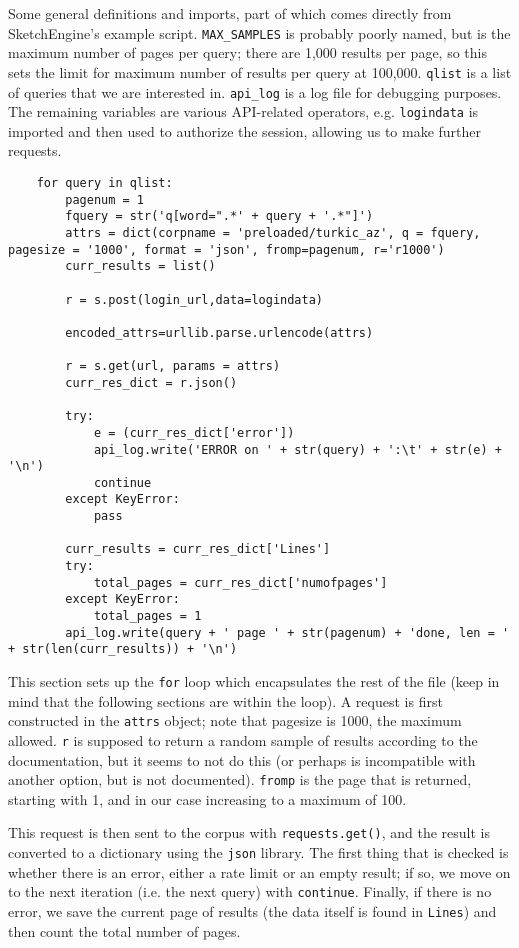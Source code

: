 \documentclass{article}      %
\begin{document}
	Some general definitions and imports, part of which comes directly from SketchEngine's example script. \texttt{MAX\_SAMPLES} is probably poorly named, but is the maximum number of pages per query; there are 1,000 results per page, so this sets the limit for maximum number of results per query at 100,000. \texttt{qlist} is a list of queries that we are interested in. \texttt{api\_log} is a log file for debugging purposes. The remaining variables are various API-related operators, e.g. \texttt{logindata} is imported and then used to authorize the session, allowing us to make further requests.
	
	\begin{verbatim}
	for query in qlist:
		pagenum = 1
		fquery = str('q[word=".*' + query + '.*"]')
		attrs = dict(corpname = 'preloaded/turkic_az', q = fquery, pagesize = '1000', format = 'json', fromp=pagenum, r='r1000')
		curr_results = list()
		
		r = s.post(login_url,data=logindata)
		
		encoded_attrs=urllib.parse.urlencode(attrs)
		
		r = s.get(url, params = attrs)
		curr_res_dict = r.json()
		
		try:
			e = (curr_res_dict['error'])
			api_log.write('ERROR on ' + str(query) + ':\t' + str(e) + '\n')
			continue
		except KeyError:
			pass
			
		curr_results = curr_res_dict['Lines']
		try:
			total_pages = curr_res_dict['numofpages']
		except KeyError:
			total_pages = 1
		api_log.write(query + ' page ' + str(pagenum) + 'done, len = ' + str(len(curr_results)) + '\n')
	\end{verbatim}
	
	This section sets up the \texttt{for} loop which encapsulates the rest of the file (keep in mind that the following sections are within the loop). A request is first constructed in the \texttt{attrs} object; note that pagesize is 1000, the maximum allowed. \texttt{r} is supposed to return a random sample of results according to the documentation, but it seems to not do this (or perhaps is incompatible with another option, but is not documented). \texttt{fromp} is the page that is returned, starting with 1, and in our case increasing to a maximum of 100.
	
	This request is then sent to the corpus with \texttt{requests.get()}, and the result is converted to a dictionary using the \texttt{json} library. The first thing that is checked is whether there is an error, either a rate limit or an empty result; if so, we move on to the next iteration (i.e. the next query) with \texttt{continue}. Finally, if there is no error, we save the current page of results (the data itself is found in \texttt{Lines}) and then count the total number of pages.
	
\end{document}
